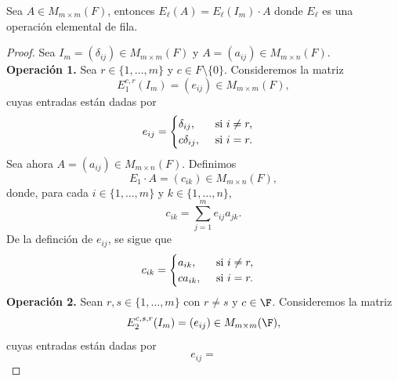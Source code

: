 \documentclass[12pt,a4paper]{book}
\begin{document}
    \begin{teorema}
        Sea $A\in M_{m\times m}(F)$, entonces $E_{\ell}(A)=E_{\ell}(I_{m})\cdot A$ donde
        $E_{\ell}$ es una operación elemental de fila.
    \end{teorema}
    \begin{proof}
        Sea $I_{m}=(\delta_{ij})\in M_{m\times m}(F)$ y $A=(a_{ij})\in M_{m\times n}(F)$.\\
        \textbf{Operación 1.} Sea $r\in\{1,\dots,m\}$ y $c\in F\setminus\{0\}$. Consideremos
        la matriz
        \begin{equation*}
            E_{1}^{c,r}(I_{m})=(e_{ij})\in M_{m\times m}(F),
        \end{equation*}
        cuyas entradas están dadas por
        \begin{equation*}
            e_{ij}=
            \begin{cases}
                \delta_{ij},\hfill\text{ si }i\neq r,\\
                c\delta_{ij},\quad\text{ si }i=r.
            \end{cases}
        \end{equation*}
        Sea ahora $A=(a_{ij})\in M_{m\times n}(F)$. Definimos
        \begin{equation*}
            E_{1}\cdot A=(c_{ik})\in M_{m\times n}(F),
        \end{equation*}
        donde, para cada $i\in\{1,\dots,m\}$ y $k\in\{1,\dots,n\}$,
        \begin{equation*}
            c_{ik}=\sum_{j=1}^{m}e_{ij}a_{jk}.
        \end{equation*}
        De la definción de $e_{ij}$, se sigue que
        \begin{equation*}
            c_{ik}=
            \begin{cases}
                a_{ik},\hfill\text{ si }i\neq r,\\
                ca_{ik},\quad\text{ si }i=r.
            \end{cases}
        \end{equation*}
        \textbf{Operación 2.} Sean $r,s\in\{1,\dots,m\}$ con $r\neq s$ y $c\in \F$. Consideremos la matriz
        \begin{equation*}
            E_{2}^{c,s,r}(I_{m})=(e_{ij})\in M_{m\times m}(\F),
        \end{equation*}
        cuyas entradas están dadas por
        \begin{equation*}
            e_{ij}=

\end{equation*}
\end{proof}
\end{document}
